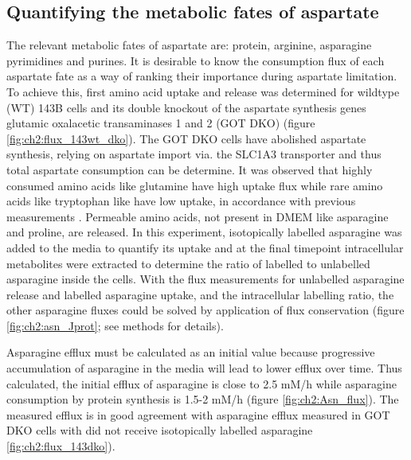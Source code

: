 \subsection{Quantifying the metabolic fates of aspartate}
The relevant metabolic fates of aspartate are: protein, arginine, asparagine pyrimidines and purines.
It is desirable to know the consumption flux of each aspartate fate as a way of ranking their importance during aspartate limitation.
To achieve this, first amino acid uptake and release was determined for wildtype (WT) 143B cells and its double knockout of the aspartate synthesis genes glutamic oxalacetic transaminases 1 and 2 (GOT DKO) (figure \ref{fig:ch2:flux_143wt_dko}).
The GOT DKO cells have abolished aspartate synthesis, relying on aspartate import via. the SLC1A3 transporter and thus total aspartate consumption can be determine.
It was observed that highly consumed amino acids like glutamine have high uptake flux while rare amino acids like tryptophan like have low uptake, in accordance with previous measurements \cite{Hosios2016-us}.
Permeable amino acids, not present in DMEM like asparagine and proline, are released.
In this experiment, isotopically labelled asparagine was added to the media to quantify its uptake and at the final timepoint intracellular metabolites were extracted to determine the ratio of labelled to unlabelled asparagine inside the cells.
With the flux measurements for unlabelled asparagine release and labelled asparagine uptake, and the intracellular labelling ratio, the other asparagine fluxes could be solved by application of flux conservation (figure \ref{fig:ch2:asn_Jprot}; see methods for details).

Asparagine efflux must be calculated as an initial value because progressive accumulation of asparagine in the media will lead to lower efflux over time.
Thus calculated, the initial efflux of asparagine is close to 2.5 mM/h while asparagine consumption by protein synthesis is 1.5-2 mM/h (figure \ref{fig:ch2:Asn_flux}).
The measured efflux is in good agreement with asparagine efflux measured in GOT DKO cells with did not receive isotopically labelled asparagine \ref{fig:ch2:flux_143dko}).

